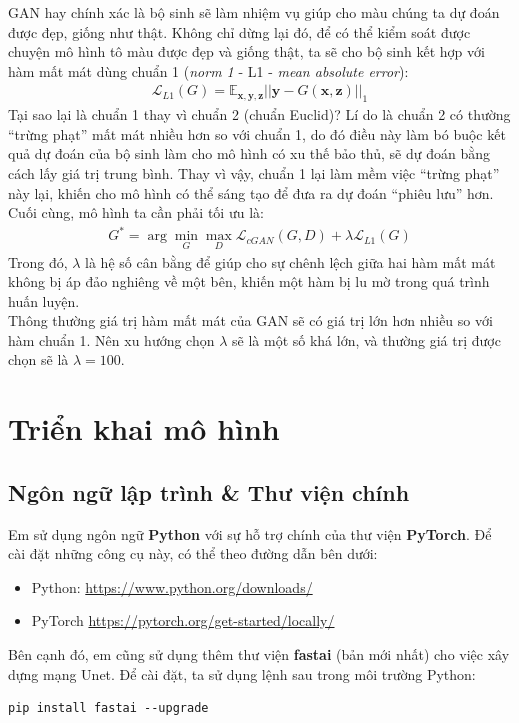 \documentclass[a4paper]{article}
\begin{document}
\noindent
GAN hay chính xác là bộ sinh sẽ làm nhiệm vụ giúp cho màu chúng ta dự đoán được đẹp, giống như thật. Không chỉ dừng lại đó, để có thể kiểm soát được chuyện mô hình tô màu được đẹp và giống thật, ta sẽ cho bộ sinh kết hợp với hàm mất mát dùng chuẩn 1 (\textit{norm 1} - L1 - \textit{mean absolute error}):
\begin{align*}
    \mathcal{L}_{L1}(G) = \mathbb{E}_{\mathbf{x}, \mathbf{y}, \mathbf{z}}\left|\left|\mathbf{y} - G(\mathbf{x}, \mathbf{z})\right|\right|_1
\end{align*}
Tại sao lại là chuẩn 1 thay vì chuẩn 2 (chuẩn Euclid)? Lí do là chuẩn 2 có thường ``trừng phạt'' mất mát nhiều hơn so với chuẩn 1, do đó điều này làm bó buộc kết quả dự đoán của bộ sinh làm cho mô hình có xu thế bảo thủ, sẽ dự đoán bằng cách lấy giá trị trung bình. Thay vì vậy, chuẩn 1 lại làm mềm việc ``trừng phạt'' này lại, khiến cho mô hình có thể sáng tạo để đưa ra dự đoán ``phiêu lưu'' hơn. \\
Cuối cùng, mô hình ta cần phải tối ưu là:
\begin{align*}
    G^* = \arg\underset{G}{\min}\underset{D}{\max}\mathcal{L}_{cGAN}(G, D) + \lambda \mathcal{L}_{L1}(G)
\end{align*}
Trong đó, $\lambda$ là hệ số cân bằng để giúp cho sự chênh lệch giữa hai hàm mất mát không bị áp đảo nghiêng về một bên, khiến một hàm bị lu mờ trong quá trình huấn luyện.\\
Thông thường giá trị hàm mất mát của GAN sẽ có giá trị lớn hơn nhiều so với hàm chuẩn 1. Nên xu hướng chọn $\lambda$ sẽ là một số khá lớn, và thường giá trị được chọn sẽ là $\lambda = 100$.

\section{Triển khai mô hình}

\subsection{Ngôn ngữ lập trình \& Thư viện chính}
Em sử dụng ngôn ngữ \textbf{Python} với sự hỗ trợ chính của thư viện \textbf{PyTorch}. Để cài đặt những công cụ này, có thể theo đường dẫn bên dưới:
\begin{itemize}
    \item Python: \href{https://www.python.org/downloads/}{https://www.python.org/downloads/}
    \item PyTorch \href{https://pytorch.org/get-started/locally/}{https://pytorch.org/get-started/locally/}
\end{itemize}
Bên cạnh đó, em cũng sử dụng thêm thư viện \textbf{fastai} (bản mới nhất) cho việc xây dựng mạng Unet. Để cài đặt, ta sử dụng lệnh sau trong môi trường Python:
\begin{lstlisting}
pip install fastai --upgrade
\end{lstlisting}
\end{document}
